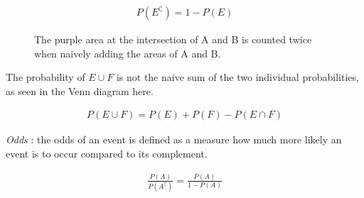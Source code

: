\begin{align}
	P(E^\complement) = 1 - P(E)
\end{align}

\begin{figure}[H]
	\centering
	\caption{The purple area at the intersection of A and B is counted twice when naively adding the areas of A and B.} 
\end{figure} 

The probability of $ E \cup F $ is not the naive sum of the two individual probabilities, as seen in the Venn diagram here.

\begin{align}
	P(E \cup F) = P(E) + P(F) - P(E \cap F)
\end{align}

\textit{Odds} : the odds of an event is defined as a measure how much more likely an event is to occur compared to its complement. 

\begin{align}
	\frac{P(A)}{P(A^\complement)} = \frac{P(A)}{1 - P(A)}
\end{align}

